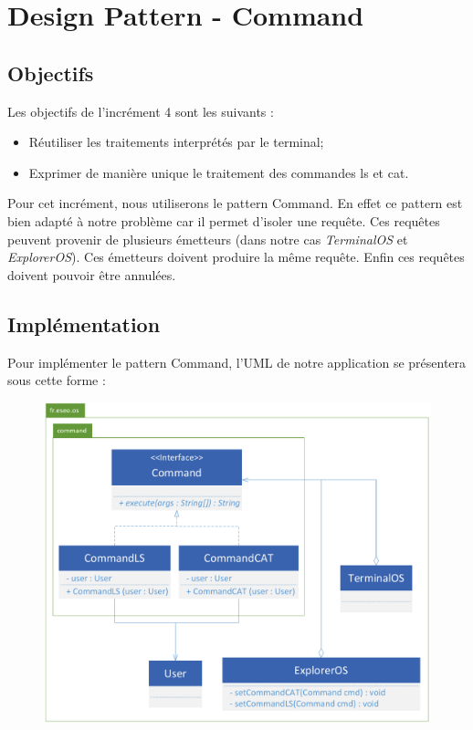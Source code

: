 \newpage
\section{Design Pattern - Command}

\subsection{Objectifs}

Les objectifs de l'incrément 4 sont les suivants :\\
\begin{itemize}
\item Réutiliser les traitements interprétés par le terminal;
\item Exprimer de manière unique le traitement des commandes ls et cat.\\
\end{itemize}

Pour cet incrément, nous utiliserons le pattern Command. En effet ce pattern est bien adapté à notre problème car il permet d’isoler une requête. Ces requêtes peuvent provenir de plusieurs émetteurs (dans notre cas \emph{TerminalOS} et \emph{ExplorerOS}). Ces émetteurs doivent produire la même requête. Enfin ces requêtes doivent pouvoir être annulées. 

\subsection{Implémentation}

Pour implémenter le pattern Command, l’UML de notre application se présentera sous cette forme :

\clearpage

\begin{figure}[!h]
\centering
\includegraphics[width=\textwidth]{../uml/uml-command}
\end{figure}

